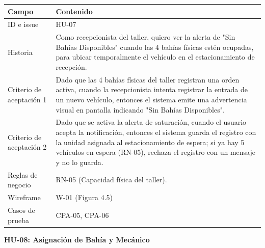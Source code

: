 {\def\LTcaptype{none} %
\begin{longtable}[]{@{}
  >{\raggedright\arraybackslash}p{}
  >{\raggedright\arraybackslash}p{}@{}}
\toprule\noalign{}
\begin{minipage}[b]{\linewidth}\raggedright
\textbf{Campo}
\end{minipage} & \begin{minipage}[b]{\linewidth}\raggedright
\textbf{Contenido}
\end{minipage} \\
\midrule\noalign{}
\endhead
\bottomrule\noalign{}
\endlastfoot
ID e issue & HU-07 \\
Historia & Como recepcionista del taller, quiero ver la alerta de "Sin
Bahías Disponibles" cuando las 4 bahías físicas estén ocupadas, para
ubicar temporalmente el vehículo en el estacionamiento de recepción. \\
Criterio de aceptación 1 & Dado que las 4 bahías físicas del taller
registran una orden activa, cuando la recepcionista intenta registrar la
entrada de un nuevo vehículo, entonces el sistema emite una advertencia
visual en pantalla indicando "Sin Bahías Disponibles". \\
Criterio de aceptación 2 & Dado que se activa la alerta de saturación,
cuando el usuario acepta la notificación, entonces el sistema guarda
el registro con la unidad asignada al estacionamiento de espera; si ya
hay 5 vehículos en espera (RN-05), rechaza el registro con un mensaje y
no lo guarda. \\
Reglas de negocio & RN-05 (Capacidad física del taller). \\
Wireframe & W-01 (Figura 4.5) \\
Casos de prueba & CPA-05, CPA-06 \\
\end{longtable}
}

\textbf{HU-08: Asignación de Bahía y Mecánico}

